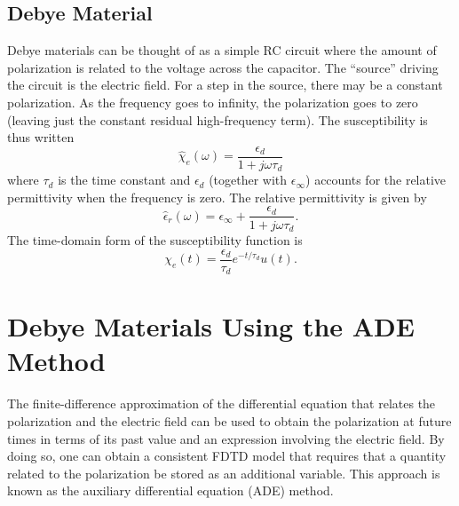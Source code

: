 \subsection{Debye Material}

Debye materials can be thought of as a simple RC circuit where the
amount of polarization is related to the voltage across the capacitor.
The ``source'' driving the circuit is the electric field.  For a step
in the source, there may be a constant polarization.  As the frequency
goes to infinity, the polarization goes to zero (leaving just the
constant residual high-frequency term).  The susceptibility is thus
written
\begin{equation}
  \hat{\chi}_e(\omega) = \frac{\epsilon_d}{1+j\omega \tau_d}
\end{equation}
where $\tau_d$ is the time constant and $\epsilon_d$ (together
with $\epsilon_\infty$) accounts for the relative permittivity when
the frequency is zero.  The relative permittivity is given by
\begin{equation}
  \hat{\epsilon}_r(\omega) =
    \epsilon_\infty + \frac{\epsilon_d}{1+j\omega \tau_d}.
\end{equation}
The time-domain form of the susceptibility function is
\begin{equation}
  \chi_e(t) = \frac{\epsilon_d}{\tau_d} e^{-t/\tau_d}u(t).
  \label{eq:debyeChiTime}
\end{equation}

\section{Debye Materials Using the ADE Method}

The finite-difference approximation of the differential equation that
relates the polarization and the electric field can be used to obtain
the polarization at future times in terms of its past value and an
expression involving the electric field.  By doing so, one can obtain
a consistent FDTD model that requires that a quantity related to the
polarization be stored as an additional variable.  This approach is
known as the auxiliary differential equation (ADE) method.

